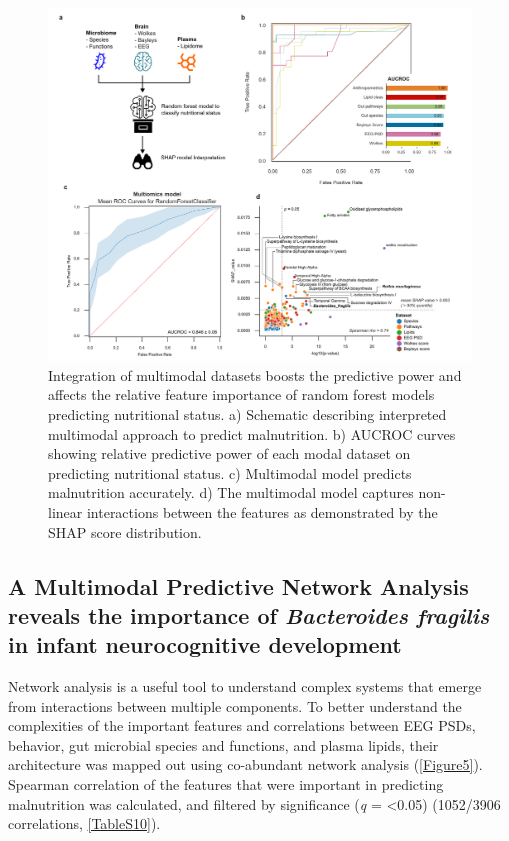 \documentclass{article}
\begin{document}
\begin{figure}[!htb]
\centering
\includegraphics[scale=0.9]{../../figures/Figure4-ai.pdf}
\caption[Integration of multimodal datasets boosts the predictive power and affects the relative feature importance of random forest models predicting nutritional status]{
	Integration of multimodal datasets boosts the predictive power and affects the relative feature importance of random forest models predicting nutritional status.
	a) Schematic describing interpreted multimodal approach to predict malnutrition.
	b) AUCROC curves showing relative predictive power of each modal dataset on predicting nutritional status.
	c) Multimodal model predicts malnutrition accurately.
	d) The multimodal model captures non-linear interactions between the features as demonstrated by the SHAP score distribution.}
\label{Figure4}
\end{figure}

\subsection*{A Multimodal Predictive Network Analysis reveals the importance of \textit{Bacteroides fragilis} in infant neurocognitive development}
Network analysis is a useful tool to understand complex systems that emerge from interactions between multiple components.
To better understand the complexities of the important features and correlations between EEG PSDs, behavior, gut microbial species and functions, and plasma lipids, their architecture was mapped out using co-abundant network analysis (\autoref{Figure5}).
Spearman correlation of the features that were important in predicting malnutrition was calculated, and filtered by significance (\textit{q} = \textless{}0.05) (1052/3906 correlations,  \autoref{TableS10}).
\end{document}
